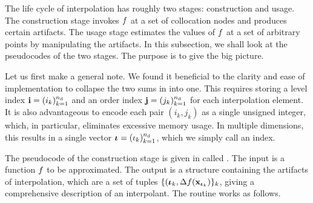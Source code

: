 The life cycle of interpolation has roughly two stages: construction and usage.
The construction stage invokes $f$ at a set of collocation nodes and produces
certain artifacts. The usage stage estimates the values of $f$ at a set of
arbitrary points by manipulating the artifacts. In this subsection, we shall
look at the pseudocodes of the two stages. The purpose is to give the big
picture. 

Let us first make a general note. We found it beneficial to the clarity and ease
of implementation to collapse the two sums in  into one.
This requires storing a level index $\mathbf{i} = (i_k)_{k = 1}^{n_\text{d}}$ and an order
index $\mathbf{j} = (j_k)_{k = 1}^{n_\text{d}}$ for each interpolation element. It is also
advantageous to encode each pair $(i_k, j_k)$ as a single unsigned integer,
which, in particular, eliminates excessive memory usage. In multiple dimensions,
this results in a single vector ${\bm{\iota}} = (\iota_k)_{k = 1}^{n_\text{d}}$, which we simply
call an index. 


The pseudocode of the construction stage is given in  called
. The  input is a function $f$ to be
approximated. The  output is a structure containing the
artifacts of interpolation, which are a set of tuples $\{ ({\bm{\iota}}_k,
\Delta f(\mathbf{x}_{{\bm{\iota}}_k}) \}_k$, giving a comprehensive description of an
interpolant. The routine works as follows.

